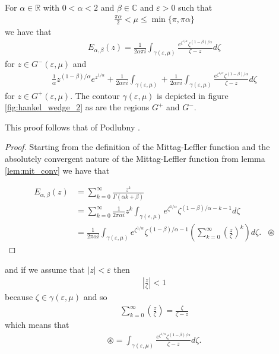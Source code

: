 \begin{lemma}
    For $ \alpha \in \mathbb{R} $ with $ 0 < \alpha < 2 $ and $ \beta \in \mathbb{C} $ and $ \varepsilon > 0 $
    such that
    \begin{align*}
	\frac{\pi \alpha}{2} < \mu \leq \min\{ \pi, \pi \alpha \}
    \end{align*}
    we have that
    \begin{align*}
	E_{\alpha, \beta}(z) = \frac{1}{2\alpha\pi i} \int_{\gamma(\varepsilon, \mu)} \frac{e^{\zeta^{1 / \alpha}}\zeta^{(1-\beta)/\alpha}}{\zeta - z} d\zeta
    \end{align*}
    for $ z \in G^{-}(\varepsilon, \mu) $
    and
    \begin{align*}
	\frac{1}{\alpha} z^{(1-\beta) / \alpha} e^{z^{1 / \alpha}} + \frac{1}{2 \alpha\pi i} \int_{\gamma(\varepsilon, \mu)} + \frac{1}{2\alpha\pi i} \int_{\gamma(\varepsilon, \mu)} \frac{e^{\zeta^{1 / \alpha}}\zeta^{(1-\beta)/\alpha}}{\zeta - z} d\zeta
    \end{align*}
    for $ z \in G^{+}(\varepsilon, \mu) $.
    The contour $ \gamma(\varepsilon, \mu) $ is depicted in figure \ref{fig:hankel_wedge_2} as are the regions $ G^+ $ and $ G^-$.
\end{lemma}
This proof follows that of Podlubny \cite{Podlubny1999}.
\begin{proof}
    Starting from the definition of the Mittag-Leffler function and the absolutely convergent nature of the Mittag-Leffler function from lemma \ref{lem:mit_conv} we have that
    
    \begin{align*}
	E_{\alpha, \beta}(z) &= \sum_{k=0}^\infty \frac{z^k}{\Gamma(\alpha k + \beta)} \\
	    &= \sum_{k=0}^\infty \frac{1}{2\pi\alpha i} z^k \int_{\gamma(\varepsilon, \mu)} e^{\zeta^{1 / \alpha}} \zeta^{(1-\beta)/\alpha - k - 1} d\zeta \\
	&= \frac{1}{2 \pi \alpha i}  \int_{\gamma(\varepsilon, \mu)} e^{\zeta^{1 / \alpha}} \zeta^{(1-\beta)/\alpha - 1} \left(\sum_{k=0}^\infty \left( \frac{z}{\zeta}\right)^k \right) d\zeta. & \circledast
   \end{align*}
\end{proof}
and if we assume that $ |z| < \varepsilon $ then
\begin{align*}
    \left| \frac{z}{\zeta}\right| < 1
\end{align*}
because $ \zeta \in \gamma(\varepsilon, \mu) $ and so
\begin{align*}
   \sum_{k=0}^\infty \left( \frac{z}{\zeta} \right) = \frac{\zeta}{\zeta - z}
\end{align*}
which means that
\begin{align*}
    \circledast = \int_{\gamma(\varepsilon, \mu)} \frac{e^{\zeta^{1 / \alpha}}\zeta^{(1-\beta)/\alpha}}{\zeta - z} d\zeta.
\end{align*}

